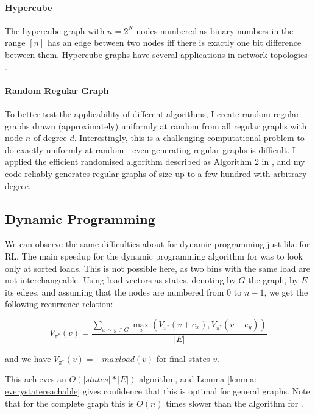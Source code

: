\paragraph{Hypercube} The hypercube graph with $n=2^N$ nodes numbered as binary numbers in the range $[n]$ has an edge between two nodes iff there is exactly one bit difference between them. Hypercube graphs have several applications in network topologies \cite{ostrouchov1987hypercubenetwork} .


\paragraph{Random Regular Graph} To better test the applicability of different algorithms, I create random regular graphs drawn (approximately) uniformly at random from all regular graphs with node $n$ of degree $d$. Interestingly, this is a challenging computational problem to do exactly uniformly at random - even generating regular graphs is difficult. I applied the efficient randomised algorithm described as Algorithm 2 in \cite{steger1999randomregulargraphs}, and my code reliably generates regular graphs of size up to a few hundred with arbitrary degree.



\subsection{Dynamic Programming}


We can observe the same difficulties about \GraphicalTwoChoice for dynamic programming just like for RL. The main speedup for the dynamic programming algorithm for \TwoThinning was to look only at sorted loads. This is not possible here, as two bins with the same load are not interchangeable. Using load vectors as states, denoting by $G$ the graph, by $E$ its edges, and assuming that the nodes are numbered from $0$ to $n-1$, we get the following recurrence relation: 


\begin{equation} \label{eq:graphicaltwochoice-dynamicprogramming}
    V_{\pi^*}(v) = \frac{\sum_{x\sim y \in G}\max_a (V_{\pi^*}(v+e_x), V_{\pi^*}(v+e_y))}{|E|}
\end{equation}


and we have $V_{\pi^*}(v)=-maxload(v)$ for final states $v$.

This achieves an $O(|states|*|E|)$ algorithm, and Lemma \ref{lemma: everystatereachable} gives confidence that this is optimal for general graphs. Note that for the complete graph this is $O(n)$ times slower than the algorithm for \TwoThinning.

